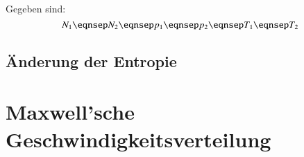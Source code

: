 Gegeben sind:
\[
    N_1
    \eqnsep
    N_2
    \eqnsep
    p_1
    \eqnsep
    p_2
    \eqnsep
    T_1
    \eqnsep
    T_2
\]

\subsection{Änderung der Entropie}

\section{Maxwell'sche Geschwindigkeitsverteilung}


\IfFileExists{\bibliographyfile}{
    \printbibliography
}{}



